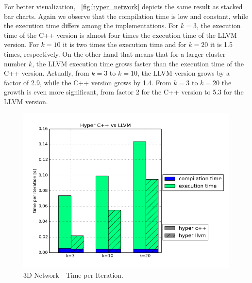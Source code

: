 For better visualization, ~\autoref{fig:hyper_network} depicts the same result as stacked bar charts. Again we observe that the compilation time is low and constant, while the execution time differs among the implementations. For $k = 3$, the execution time of the C++ version is almost four times the execution time of the LLVM version. For $k = 10$ it is two times the execution time and for $k = 20$ it is 1.5 times, respectively. On the other hand that means that for a larger cluster number $k$, the LLVM execution time grows  faster than the execution time of the C++ version. Actually, from $k = 3$ to $k = 10$, the LLVM version grows by a factor of 2.9, while the C++ version grows by 1.4. From $k = 3$ to $k = 20$ the growth is even more significant, from factor 2 for the C++ version to 5.3 for the LLVM version.


\begin{figure}[htsb]
  \centering
  \includegraphics[scale=0.5, trim="0cm 1.5cm 0cm 0cm"]{figures/charts/hyper_network}
  \caption[3D Network - Time per Iteration]{3D Network - Time per Iteration.}
  \label{fig:hyper_network}
\end{figure}

